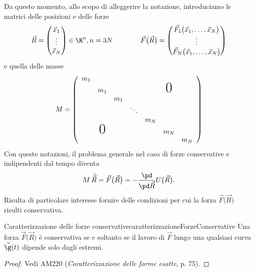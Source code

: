 Da questo momento, allo scopo di alleggerire la notazione, introduciamo le matrici delle posizioni e delle forze
\[
	\vec{R} = \begin{pmatrix}\vec{x}_1\\\vdots\\\vec{x}_N\end{pmatrix}\in\R^n, n = 3N \qquad\qquad
	\vec{F}\big(\vec{R}\big) = \begin{pmatrix}\vec{F}_1\big(\vec{x}_1, \ldots, \vec{x}_N\big)\\\vdots\\\vec{F}_N\big(\vec{x}_1, \ldots, \vec{x}_N\big)\end{pmatrix}
\]
e quella delle masse
\[
	M = \left( \begin{array}{ccccccc}
			m_1    & \hfill        & \hfill & \hfill & \hfill & \hfill        & \hfill \\
			\hfill & m_1           & \hfill & \hfill & \hfill & \text{\huge0} & \hfill \\
			\hfill & \hfill        & m_1    & \hfill & \hfill & \hfill        & \hfill \\
			\hfill & \hfill        & \hfill & \ddots & \hfill & \hfill        & \hfill \\
			\hfill & \hfill        & \hfill & \hfill & m_N    & \hfill        & \hfill \\
			\hfill & \text{\huge0} & \hfill & \hfill & \hfill & m_N           & \hfill \\
			\hfill & \hfill        & \hfill & \hfill & \hfill & \hfill        & m_N    \\
		\end{array} \right)
\]
Con queste notazioni, il problema generale nel caso di forze conservative e indipendenti dal tempo diventa
\[
	M\,\ddot{\vec{R}} = \vec{F}\big(\vec{R}\big) = -\frac{\pd}{\pd\vec{R}}U\big(\vec{R}\big).
\]
Risulta di particolare interesse fornire delle condizioni per cui la forza \(\vec{F}\big(\vec{R}\big)\) risulti conservativa.

\begin{teor}{Caratterizzazione delle forze conservative}{caratterizzazioneForzeConservative}
	Una forza \(\vec{F}\big(\vec{R}\big)\) è conservativa se e soltanto se il lavoro di \(\vec{F}\) lungo una qualsiasi curva \(\vec{\g}(t)\) dipende solo dagli estremi.
\end{teor}

\begin{proof}
	Vedi AM220 (\emph{Caratterizzazione delle forme esatte}, p. 75).
\end{proof}

